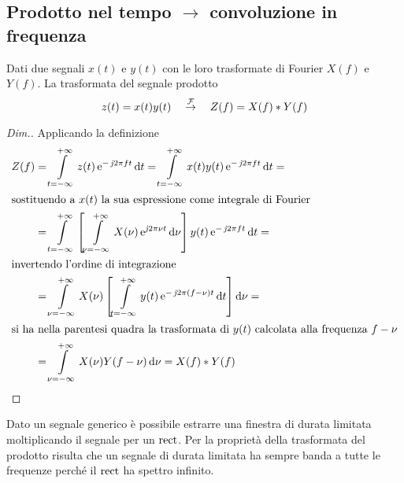 \subsection{Prodotto nel tempo \texorpdfstring{$\to$}{come} convoluzione in frequenza}
Dati due segnali $x(t)$ e $y(t)$ con le loro trasformate di Fourier $X(f)$ e $Y(f)$. La trasformata del segnale prodotto
\begin{equation}
	z(t)=x(t) y(t)\quad\overset{\operatorname{\mathcal{F}}}{\rightarrow}\quad Z(f)=X(f)\ast Y(f)
\end{equation}

\begin{proof}[Dim.] Applicando la definizione
\begin{align*}
	Z(f)&=\intd{t=-\infty}{+\infty}{z(t)\e{-\imath 2\pi f t}}{t}=\intd{t=-\infty}{+\infty}{x(t)y(t)\e{-\imath 2\pi f t}}{t}=\\
\intertext{sostituendo a $x(t)$ la sua espressione come integrale di Fourier}
	&=\intd{t=-\infty}{+\infty}{\left[\intd{\nu=-\infty}{+\infty}{X(\nu)\e{\imath 2\pi\nu t}}{\nu}\right]y(t)\e{-\imath 2\pi f t}}{t}=\\
\intertext{invertendo l'ordine di integrazione}
	&=\intd{\nu=-\infty}{+\infty}{X(\nu)\left[\intd{t=-\infty}{+\infty}{y(t)\e{-\imath 2\pi(f-\nu)t}}{t}\right]}{\nu}=\\
\intertext{si ha nella parentesi quadra la trasformata di $y(t)$ calcolata alla frequenza $f-\nu$}
	&=\intd{\nu=-\infty}{+\infty}{X(\nu)Y(f-\nu)}{\nu} = X(f)\ast Y(f)
\qedhere
\end{align*}
\end{proof}

\begin{nota}
	Dato un segnale generico è possibile estrarre una finestra di durata limitata moltiplicando il segnale per un $\operatorname{rect}$. Per la proprietà della trasformata del prodotto risulta che un segnale di durata limitata ha sempre banda a tutte le frequenze perché il $\operatorname{rect}$ ha spettro infinito.
\end{nota}

